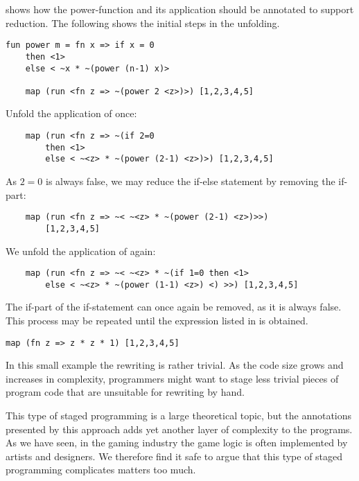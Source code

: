  shows how the power-function and its application should be annotated to support reduction. The following shows the initial steps in the unfolding.
\begin{lstlisting}[label={lst:metaml:annotation}, caption={MetaML annotations}]
fun power m = fn x => if x = 0
    then <1>
    else < ~x * ~(power (n-1) x)>

    map (run <fn z => ~(power 2 <z>)>) [1,2,3,4,5]
\end{lstlisting}
Unfold the application of  once:
\begin{verbatim}
    map (run <fn z => ~(if 2=0 
        then <1> 
        else < ~<z> * ~(power (2-1) <z>)>) [1,2,3,4,5]
\end{verbatim}
As $2=0$ is always false, we may reduce the if-else statement by removing the if-part:
\begin{verbatim}
    map (run <fn z => ~< ~<z> * ~(power (2-1) <z>)>>)
        [1,2,3,4,5]
\end{verbatim}
We unfold the application of  again:
\begin{verbatim}
    map (run <fn z => ~< ~<z> * ~(if 1=0 then <1>
        else < ~<z> * ~(power (1-1) <z>) <) >>) [1,2,3,4,5]
\end{verbatim}

The if-part of the if-statement can once again be removed, as it is always false. This process may be repeated until the expression listed in  is obtained.
\begin{lstlisting}[label={lst:metaml:final}, caption={MetaML \ttt{power}-function after unfolding}]
map (fn z => z * z * 1) [1,2,3,4,5]
\end{lstlisting}

In this small example the rewriting is rather trivial. As the code size grows and increases in complexity, programmers might want to stage less trivial pieces of program code that are unsuitable for rewriting by hand. 

This type of staged programming is a large theoretical topic, but the annotations presented by this approach adds yet another layer of complexity to the programs. As we have seen, in the gaming industry the game logic is often implemented by artists and designers. We therefore find it safe to argue that this type of staged programming complicates matters too much.

